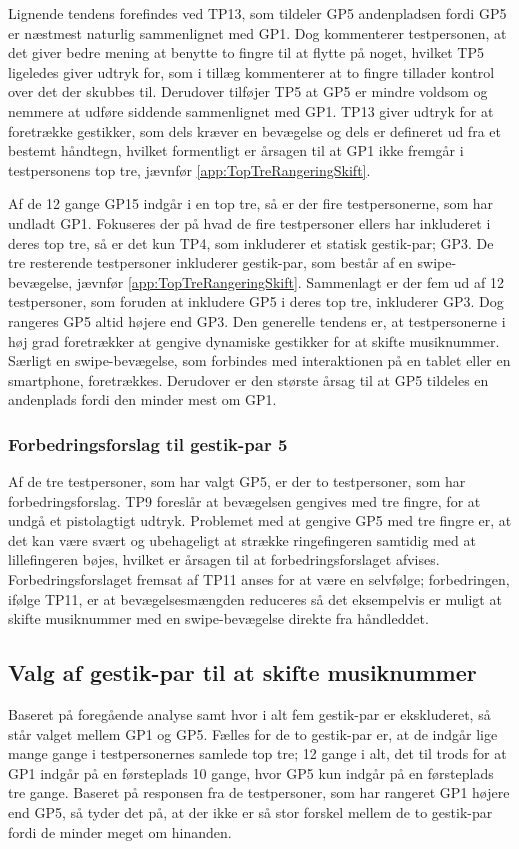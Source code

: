 Lignende tendens forefindes ved TP13, som tildeler GP5 andenpladsen fordi GP5 er næstmest naturlig sammenlignet med GP1. Dog kommenterer testpersonen, at det giver bedre mening at benytte to fingre til at flytte på noget, hvilket TP5 ligeledes giver udtryk for, som i tillæg kommenterer at to fingre tillader kontrol over det der skubbes til. Derudover tilføjer TP5 at GP5 er mindre voldsom og nemmere at udføre siddende sammenlignet med GP1. TP13 giver udtryk for at foretrække gestikker, som dels kræver en bevægelse og dels er defineret ud fra et bestemt håndtegn, hvilket formentligt er årsagen til at GP1 ikke fremgår i testpersonens top tre, jævnfør \autoref{app:TopTreRangeringSkift}.

Af de 12 gange GP15 indgår i en top tre, så er der fire testpersonerne, som har undladt GP1. Fokuseres der på hvad de fire testpersoner ellers har inkluderet i deres top tre, så er det kun TP4, som inkluderer et statisk gestik-par; GP3. De tre resterende testpersoner inkluderer gestik-par, som består af en swipe-bevægelse, jævnfør \autoref{app:TopTreRangeringSkift}. Sammenlagt er der fem ud af 12 testpersoner, som foruden at inkludere GP5 i deres top tre, inkluderer GP3. Dog rangeres GP5 altid højere end GP3.\blankline 
%
Den generelle tendens er, at testpersonerne i høj grad foretrækker at gengive dynamiske gestikker for at skifte musiknummer. Særligt en swipe-bevægelse, som forbindes med interaktionen på en tablet eller en smartphone, foretrækkes. Derudover er den største årsag til at GP5 tildeles en andenplads fordi den minder mest om GP1.   
%
\subsubsection{Forbedringsforslag til gestik-par 5}
\label{TestresultaterValgAfGestikkerForbedringGP5Skift}
%
Af de tre testpersoner, som har valgt GP5, er der to testpersoner, som har forbedringsforslag. TP9 foreslår at bevægelsen gengives med tre fingre, for at undgå et pistolagtigt udtryk. Problemet med at gengive GP5 med tre fingre er, at det kan være svært og ubehageligt at strække ringefingeren samtidig med at lillefingeren bøjes, hvilket er årsagen til at forbedringsforslaget afvises. Forbedringsforslaget fremsat af TP11 anses for at være en selvfølge; forbedringen, ifølge TP11, er at bevægelsesmængden reduceres så det eksempelvis er muligt at skifte musiknummer med en swipe-bevægelse direkte fra håndleddet. 
%
\subsection{Valg af gestik-par til at skifte musiknummer}
\label{TestresultaterValgAfGestikkerValgSkift}
%
Baseret på foregående analyse samt  hvor i alt fem gestik-par er ekskluderet, så står valget mellem GP1 og GP5. Fælles for de to gestik-par er, at de indgår lige mange gange i testpersonernes samlede top tre; 12 gange i alt, det til trods for at GP1 indgår på en førsteplads 10 gange, hvor GP5 kun indgår på en førsteplads tre gange. Baseret på responsen fra de testpersoner, som har rangeret GP1 højere end GP5, så tyder det på, at der ikke er så stor forskel mellem de to gestik-par fordi de minder meget om hinanden.

